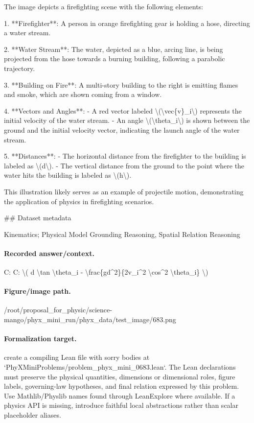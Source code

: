 The image depicts a firefighting scene with the following elements:

1. **Firefighter**: A person in orange firefighting gear is holding a hose, directing a water stream.

2. **Water Stream**: The water, depicted as a blue, arcing line, is being projected from the hose towards a burning building, following a parabolic trajectory.

3. **Building on Fire**: A multi-story building to the right is emitting flames and smoke, which are shown coming from a window.

4. **Vectors and Angles**:
   - A red vector labeled \textbackslash{}(\textbackslash{}vec\{v\}\_i\textbackslash{}) represents the initial velocity of the water stream.
   - An angle \textbackslash{}(\textbackslash{}theta\_i\textbackslash{}) is shown between the ground and the initial velocity vector, indicating the launch angle of the water stream.

5. **Distances**:
   - The horizontal distance from the firefighter to the building is labeled as \textbackslash{}(d\textbackslash{}).
   - The vertical distance from the ground to the point where the water hits the building is labeled as \textbackslash{}(h\textbackslash{}).

This illustration likely serves as an example of projectile motion, demonstrating the application of physics in firefighting scenarios.

\#\# Dataset metadata

Kinematics; Physical Model Grounding Reasoning, Spatial Relation Reasoning

\paragraph{Recorded answer/context.}
C: C: \textbackslash{}( d \textbackslash{}tan \textbackslash{}theta\_i - \textbackslash{}frac\{gd\textasciicircum{}2\}\{2v\_i\textasciicircum{}2 \textbackslash{}cos\textasciicircum{}2 \textbackslash{}theta\_i\} \textbackslash{})

\paragraph{Figure/image path.}
/root/proposal\_for\_physic/science-mango/phyx\_mini\_run/phyx\_data/test\_image/683.png

\paragraph{Formalization target.}
create a compiling Lean file with sorry bodies at `PhyXMiniProblems/problem\_phyx\_mini\_0683.lean`. The Lean declarations must preserve the physical quantities, dimensions or dimensional roles, figure labels, governing-law hypotheses, and final relation expressed by this problem.
Use Mathlib/Physlib names found through LeanExplore where available. If a physics API is missing, introduce faithful local abstractions rather than scalar placeholder aliases.


